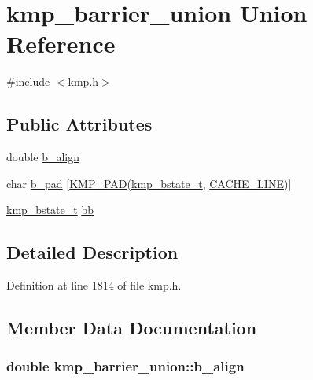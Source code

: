 \hypertarget{unionkmp__barrier__union}{\section{kmp\-\_\-barrier\-\_\-union Union Reference}
\label{unionkmp__barrier__union}
}


{\ttfamily \#include $<$kmp.\-h$>$}

\subsection*{Public Attributes}
\begin{DoxyCompactItemize}
\item 
double \hyperlink{unionkmp__barrier__union_ab6ba7ef028e55e12ee1465c2dadd974a}{b\-\_\-align}
\item 
char \hyperlink{unionkmp__barrier__union_a1b1194e8d7ad8ae3239c745ded63301a}{b\-\_\-pad} \mbox{[}\hyperlink{kmp__lock_8h_a7e782410115489f45ab1686c39a2bb89}{K\-M\-P\-\_\-\-P\-A\-D}(\hyperlink{kmp_8h_a1493aa680c299d09746e1edfc9116b24}{kmp\-\_\-bstate\-\_\-t}, \hyperlink{kmp__os_8h_a86194c659a2d795e5f5949d293ae4661}{C\-A\-C\-H\-E\-\_\-\-L\-I\-N\-E})\mbox{]}
\item 
\hyperlink{kmp_8h_a1493aa680c299d09746e1edfc9116b24}{kmp\-\_\-bstate\-\_\-t} \hyperlink{unionkmp__barrier__union_ae01f3b4d1f256f9ec18b0528587bcceb}{bb}
\end{DoxyCompactItemize}


\subsection{Detailed Description}


Definition at line 1814 of file kmp.\-h.



\subsection{Member Data Documentation}
\hypertarget{unionkmp__barrier__union_ab6ba7ef028e55e12ee1465c2dadd974a}{
\subsubsection[{b\-\_\-align}]{\setlength{\rightskip}{0pt plus 5cm}double kmp\-\_\-barrier\-\_\-union\-::b\-\_\-align}}\label{unionkmp__barrier__union_ab6ba7ef028e55e12ee1465c2dadd974a}


